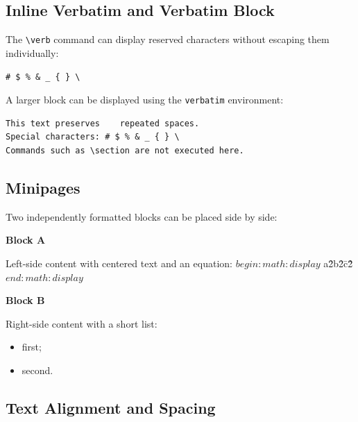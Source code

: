 \documentclass[10pt,a4paper,twocolumn]{article}
\theoremstyle{definition}
\theoremstyle{remark}
\begin{document}
\subsection{Inline Verbatim and Verbatim Block}

The \verb|\verb| command can display reserved characters without
escaping them individually:

\begin{center}
  \verb|# $ % & _ { } \|
\end{center}

A larger block can be displayed using the \texttt{verbatim}
environment:

\begin{verbatim}
This text preserves    repeated spaces.
Special characters: # $ % & _ { } \
Commands such as \section are not executed here.
\end{verbatim}

\subsection{Minipages}

Two independently formatted blocks can be placed side by side:

\begin{center}
  \begin{minipage}[t]{0.46\columnwidth}
    \centering
    \textbf{Block A}

    \smallskip

    Left-side content with centered text and an equation:
    $begin:math:display$
      a\^2\+b\^2\=c\^2\.
    $end:math:display$
  \end{minipage}
  \hfill
  \begin{minipage}[t]{0.46\columnwidth}
    \centering
    \textbf{Block B}

    \smallskip

    Right-side content with a short list:
    \begin{itemize}
      \item first;
      \item second.
    \end{itemize}
  \end{minipage}
\end{center}

\subsection{Text Alignment and Spacing}
\end{document}
